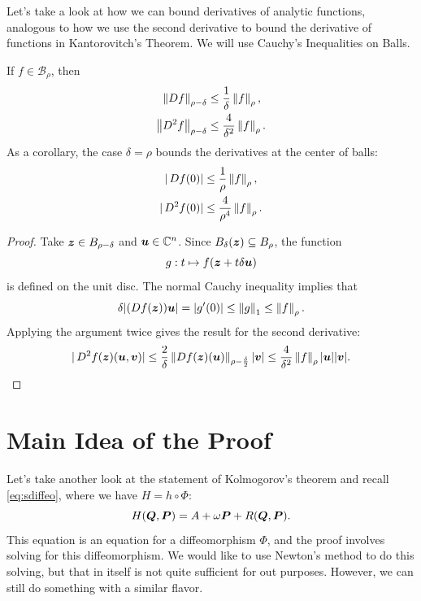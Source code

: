\documentclass[twoside,letterpaper,11pt]{article}
\numberwithin{equation}{section}
\begin{document}
Let's take a look at how we can bound derivatives of analytic functions,
analogous to how we use the second derivative to bound the derivative of
functions in Kantorovitch's Theorem.
We will use Cauchy's Inequalities on Balls.
\begin{thm}
  If $f \in \mathcal{B}_{\rho}$, then
  \begin{align*}
    \norm{\Dif f}_{\rho - \delta} &\leq \frac{1}{\delta} \norm{f}_{\rho},\\
    \norm{\Dif^2 f}_{\rho - \delta} &\leq \frac{4}{\delta^2} \norm{f}_{\rho}.
  \end{align*}
  As a corollary, the case $\delta = \rho$ bounds the derivatives at the center
  of balls:
  \begin{align*}
    |\Dif f(0)| &\leq \frac{1}{\rho} \norm{f}_{\rho},\\
    |\Dif^2 f(0)| &\leq \frac{4}{\rho^4} \norm{f}_{\rho}.
  \end{align*}
\end{thm}
\begin{proof}
  Take $\bm{z} \in B_{\rho - \delta}$ and $\bm{u} \in \mathbb{C}^n$.
  Since $B_{\delta}(\bm{z}) \subseteq B_{\rho}$, the function
  \begin{equation*}
    g : t \mapsto f(\bm{z} + t \delta \bm{u})
  \end{equation*}
  is defined on the unit disc.
  The normal Cauchy inequality implies that
  \begin{equation*}
    \delta|(\Dif f(\bp{z})) \bp{u}| = |g'(0)| \leq \norm{g}_{1} \leq
    \norm{f}_{\rho}.
  \end{equation*}
  Applying the argument twice gives the result for the second derivative:
  \begin{equation*}
    |\Dif^2 f(\bp{z})(\bp{u}, \bp{v})| \leq \frac{2}{\delta} \norm{\Dif f
      (\bp{z})(\bp{u})}_{\rho - \frac{\delta}{2}}|\bp{v}| \leq
    \frac{4}{\delta^2} \norm{f}_{\rho} |\bp{u}||\bp{v}|.
  \end{equation*}
\end{proof}

\section{Main Idea of the Proof}
\label{sec:main-idea-proof}

Let's take another look at the statement of Kolmogorov's theorem and recall
\cref{eq:sdiffeo}, where we have $H = h \circ \Phi$:
\begin{equation*}
  H(\bm{Q}, \bm{P}) = A + \omega \bm{P} + R(\bm{Q}, \bm{P}).
\end{equation*}
This equation is an equation for a diffeomorphism $\Phi$, and the proof involves
solving for this diffeomorphism.
We would like to use Newton's method to do this solving, but that in itself is
not quite sufficient for out purposes.
However, we can still do something with a similar flavor.
\end{document}
